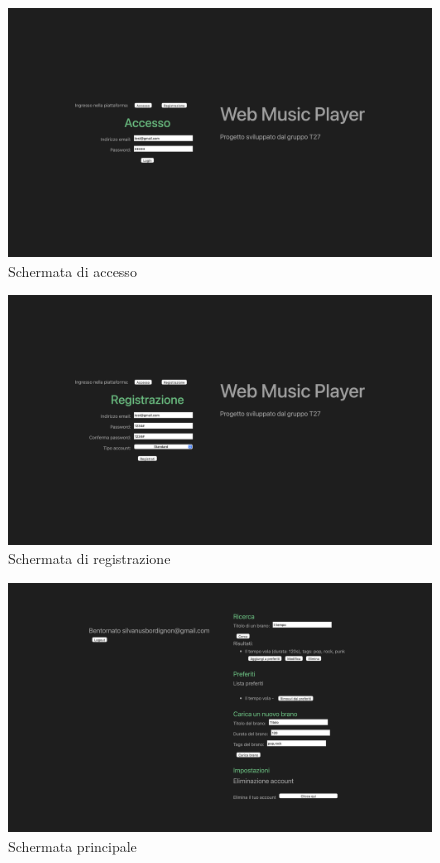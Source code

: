 \documentclass[a4paper,12pt]{article}
\begin{document}
\begin{figure}[htp]
    \centering
    \includegraphics[width=\textwidth]{code/accesso.png}
    \caption{Schermata di accesso}
\end{figure}

\begin{figure}[htp]
    \centering
    \includegraphics[width=\textwidth]{code/registrazione.png}
    \caption{Schermata di registrazione}
\end{figure}

\begin{figure}[htp]
    \centering
    \includegraphics[width=\textwidth]{code/principale.png}
    \caption{Schermata principale}
\end{figure}
\end{document}
